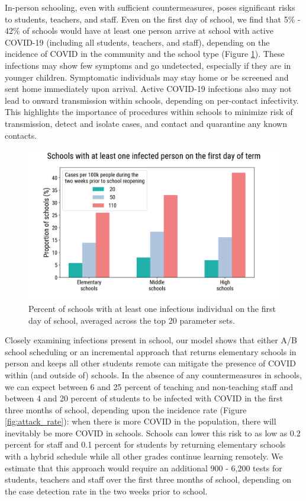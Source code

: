 \documentclass[preprint,12pt]{elsarticle}
\begin{document}
In-person schooling, even with sufficient countermeasures, poses significant risks to students, teachers, and staff. Even on the first day of school, we find that 5\% - 42\% of schools would have at least one person arrive at school with active COVID-19 (including all students, teachers, and staff), depending on the incidence of COVID in the community and the school type (Figure \ref{fig:schools_with_a_case}). These infections may show few symptoms and go undetected, especially if they are in younger children. Symptomatic individuals may stay home or be screened and sent home immediately upon arrival. Active COVID-19 infections also may not lead to onward transmission within schools, depending on per-contact infectivity. This highlights the importance of procedures within schools to minimize risk of transmission, detect and isolate cases, and contact and quarantine any known contacts. 

\begin{figure}[h]
    \centering
    \includegraphics[scale=0.5]{schools_with_a_case_2020-08-05.png}
    \caption{Percent of schools with at least one infectious individual on the first day of school, averaged across the top 20 parameter sets.}
    \label{fig:schools_with_a_case}
\end{figure}

Closely examining infections present in school, our model shows that either A/B school scheduling or an incremental approach that returns elementary schools in person and keeps all other students remote can mitigate the presence of COVID within (and outside of) schools. In the absence of any countermeasures in schools, we can expect between 6 and 25 percent of teaching and non-teaching staff and between 4 and 20 percent of students to be infected with COVID in the first three months of school, depending upon the incidence rate (Figure \ref{fig:attack_rate}): when there is more COVID in the population, there will inevitably be more COVID in schools. Schools can lower this risk to as low as 0.2 percent for staff and 0.1 percent for students by returning elementary schools with a hybrid schedule while all other grades continue learning remotely. We estimate that this approach would require an additional 900 - 6,200 tests for students, teachers and staff over the first three months of school, depending on the case detection rate in the two weeks prior to school.
\end{document}
